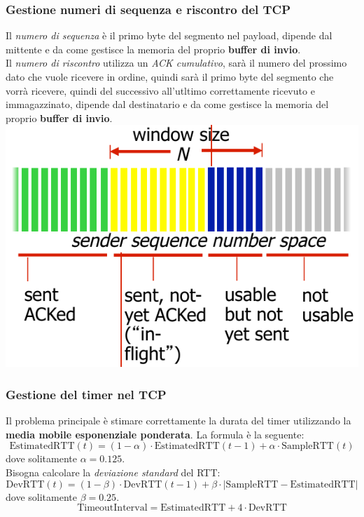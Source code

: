\subsubsection{Gestione numeri di sequenza e riscontro del TCP}
Il \textit{numero di sequenza} è il primo byte del segmento nel payload, dipende dal mittente e da come gestisce la memoria del proprio \textbf{buffer di invio}. \\
Il \textit{numero di riscontro} utilizza un \textit{ACK cumulativo}, sarà il numero del prossimo dato che vuole ricevere in ordine, quindi sarà il primo byte del segmento che vorrà ricevere, quindi del successivo all'utltimo correttamente ricevuto e immagazzinato, dipende dal destinatario e da come gestisce la memoria del proprio \textbf{buffer di invio}. \\ 
\includegraphics[width=\textwidth]{./img/tcpseqack.png} 

\subsubsection{Gestione del timer nel TCP}
Il problema principale è stimare correttamente la durata del timer utilizzando la \textbf{media mobile esponenziale ponderata}. La formula è la seguente:
\[
\text{EstimatedRTT}(t) = (1 - \alpha) \cdot \text{EstimatedRTT}(t-1) + \alpha \cdot \text{SampleRTT}(t)
\]
dove solitamente \(\alpha = 0.125\). \\
Bisogna calcolare la \textit{deviazione standard} del RTT:
\[
  \text{DevRTT}(t) = (1 - \beta) \cdot \text{DevRTT}(t-1) + \beta \cdot \lvert \text{SampleRTT} - \text{EstimatedRTT}\rvert
\]
dove solitamente \(\beta = 0.25\).
\[\text{TimeoutInterval} = \text{EstimatedRTT} + 4 \cdot \text{DevRTT}\]

